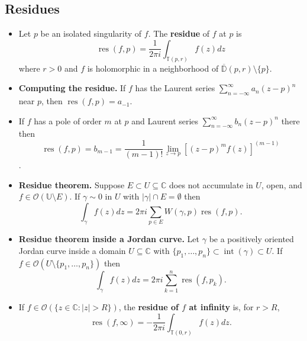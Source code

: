 \documentclass{article}
\DeclareMathOperator{\interior}{int}
\DeclareMathOperator{\res}{res}
\newenvironment{topic}[1]{%
{\subsection{#1}}%
\begin{itemize}%
}{%
\end{itemize}%
}
\newcommand{\theorem}[1]{\item {\bf #1.}}
\newcommand{\corollary}[1]{\item {\bf #1.}}
\newcommand{\term}[1]{{\bf #1}}
\newcommand{\holo}[1]{\mathcal{O}(#1)}
\newcommand{\remark}{\item}
\newcommand{\cdisk}[2]{\overline{\mathbb{D}}(#1, #2)}
\newcommand{\sphere}[2]{\mathbb{T}{(#1, #2)}}
\begin{document}
\begin{topic}{Residues}

\remark Let $p$ be an isolated singularity of $f$. The \term{residue} of $f$ at $p$ is $$\res(f, p) = \dfrac{1}{2 \pi i} \int_{\sphere{p}{r}} f(z) dz$$ where $r > 0$ and $f$ is holomorphic in a neighborhood of $\cdisk{p}{r} \setminus \{p\}$.

\theorem{Computing the residue} If $f$ has the Laurent series $\sum_{n=-\infty}^{\infty} a_n (z - p)^n$ near $p$, then $\res(f, p) = a_{-1}$.

\remark If $f$ has a pole of order $m$ at $p$ and Laurent series $\sum_{n=-\infty}^{\infty} b_n (z - p)^n$ there then $$\res(f, p) = b_{m-1} = \dfrac{1}{(m - 1)!} \lim_{z \to p} \left[(z - p)^m f(z)\right]^{(m-1)}$$.

\theorem{Residue theorem} Suppose $E \subset U \subseteq \mathbb{C}$ does not accumulate in $U$, open, and $f \in \holo{\mathbb{U} \setminus E}$. If $\gamma \sim 0$ in $U$ with $|\gamma| \cap E = \emptyset$ then $$\int_{\gamma} f(z) dz = 2 \pi i \sum_{p \in E} W(\gamma, p) \res(f, p).$$

\corollary{Residue theorem inside a Jordan curve} Let $\gamma$ be a positively oriented Jordan curve inside a domain $U \subseteq \mathbb{C}$ with $\{p_1, \ldots, p_n\} \subset \interior(\gamma) \subset U$. If $f \in \holo{U \setminus \{p_1, \ldots, p_n\}}$ then $$\int_\gamma f(z) dz = 2 \pi i \sum_{k=1}^n \res(f, p_k).$$

\remark If $f \in \holo{\{z \in \mathbb{C} : |z| > R\}}$, the \term{residue of $f$ at infinity} is, for $r > R$, $$\res(f, \infty) = -\dfrac{1}{2 \pi i} \int_{\sphere{0}{r}} f(z) dz.$$

\end{topic}
\end{document}
